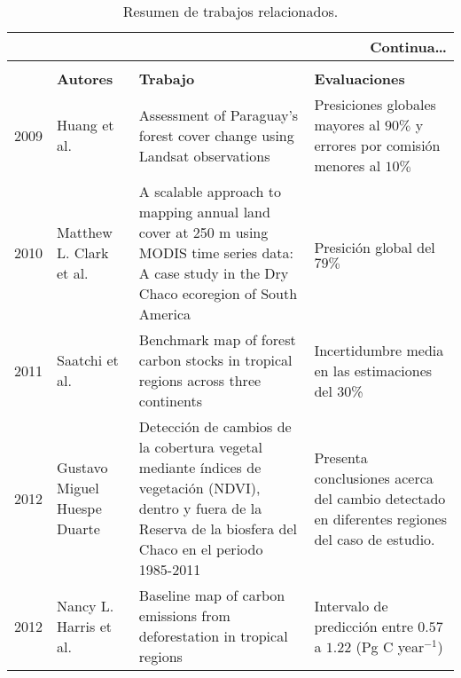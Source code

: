 	\begin{longtable}{|p{3cm}|p{3cm}|p{3cm}|p{3cm}|}

		 \hline
		 \endhead
		 \hline
		 \multicolumn{4}{|r|}{{Continua\ldots}} \\

		 \hline
		 \endfoot
		 
		 \hline 
		 		 		\caption{Resumen de trabajos relacionados.} \label{t:resumenrelacionado} \\
		 \endlastfoot
		 
\multicolumn{1}{|l|}{{\bf A\~{n}o}} & \multicolumn{1}{l|}{{\bf Autores}}                                                                                                                                            & \multicolumn{1}{l|}{{\bf Trabajo}} & \multicolumn{1}{l|}{{\bf Evaluaciones}} \\ \hline
				2009          & Huang et al.                                           & Assessment of Paraguay's forest cover change using Landsat observations                                                                                                & Presiciones globales mayores al $90\%$ y errores por comisi\'on menores al $10\%$         \\ \hline
				2010          & Matthew L. Clark et al.                                & A scalable approach to mapping annual land cover at 250 m using MODIS time series data: A case study in the Dry Chaco ecoregion of South America                       & Presici\'on global del $79\%$                                                             \\ \hline
				2011          & Saatchi et al.                                         & Benchmark map of forest carbon stocks in tropical regions across three continents                                                                                      & Incertidumbre media en las estimaciones del 30\%                                          \\ \hline
				2012          & Gustavo Miguel Huespe Duarte                           & Detecci\'on de cambios de la cobertura vegetal mediante \'indices de vegetaci\'on (NDVI), dentro y fuera de la Reserva de la biosfera del Chaco en el periodo 1985-2011  & Presenta conclusiones acerca del cambio detectado en diferentes regiones del caso de estudio.                                                                               \\ \hline
				2012          & Nancy L. Harris et al.                                 & Baseline map of carbon emissions from deforestation in tropical regions                                                                                                & Intervalo de predicci\'on entre $ 0.57 $ a $ 1.22 $ (Pg C year$ ^{-1} $)                      \\ \hline

\end{longtable}
